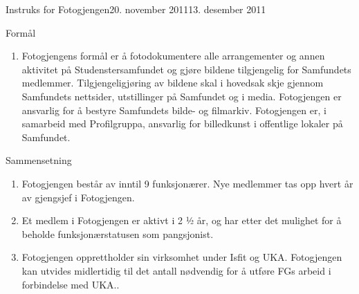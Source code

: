 \begin{instruks}{Instruks for Fotogjengen}{20. november 2011}{13. desember 2011}

    \begin{instruksledd}{Formål}
        \begin{enumerate}
            \item Fotogjengens formål er å fotodokumentere alle arrangementer og annen aktivitet på Studenstersamfundet og gjøre bildene tilgjengelig for Samfundets medlemmer.  Tilgjengeligjøring av bildene skal i hovedsak skje gjennom Samfundets nettsider, utstillinger på Samfundet og i media. Fotogjengen er ansvarlig for å bestyre Samfundets bilde- og filmarkiv. Fotogjengen er, i samarbeid med Profilgruppa, ansvarlig for billedkunst i offentlige lokaler på Samfundet. 
        \end{enumerate}
    \end{instruksledd}
    
    \begin{instruksledd}{Sammensetning}
        \begin{enumerate} 
            \item Fotogjengen består av inntil 9 funksjonærer. Nye medlemmer tas opp hvert år av
                gjengsjef i Fotogjengen.
            \item Et medlem i Fotogjengen er aktivt i 2 ½ år, og har etter det mulighet for å beholde
                funksjonærstatusen som pangsjonist.
            \item Fotogjengen opprettholder sin virksomhet under Isfit og UKA. Fotogjengen kan utvides
                midlertidig til det antall nødvendig for å utføre FGs arbeid i forbindelse med UKA..
        \end{enumerate}
    \end{instruksledd}


\end{instruks}
